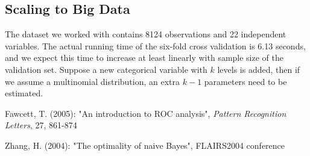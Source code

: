 \documentclass{article}
\begin{document}
\begin{multicols}{2}
\subsection{Scaling to Big Data}
The dataset we worked with contains 8124 observations and 22 independent variables. The actual running time of the six-fold cross validation is 6.13 seconds, and we expect this time to increase at least linearly with sample size of the validation set. Suppose a new categorical variable with $k$ levels is added, then if we assume a multinomial distribution, an extra $k-1$ parameters need to be estimated. 







\begin{thebibliography}{}

\bibitem{}
	Fawcett, T. (2005):
	"An introduction to ROC analysis",
	\textit{Pattern Recognition Letters}, 27, 861-874  
  
\bibitem{}
	Zhang, H. (2004):
	"The optimality of naive Bayes",
	FLAIRS2004 conference
	
	
\end{thebibliography}


\end{multicols}
\end{document}
